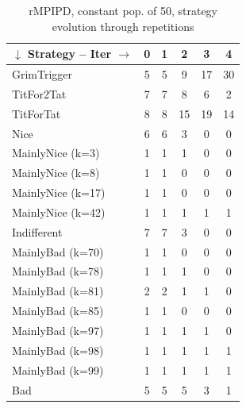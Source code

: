 \documentclass[journal,10pt,twoside]{IEEEtran}
\begin{document}
\begin{table}[ht]
	\caption{rMPIPD, constant pop. of 50, strategy evolution through repetitions}
	\label{tab:ripdmp-const}
	\centering
    \begin{tabular}{l|ccccc} \toprule
    	$\downarrow$ Strategy -- Iter $\rightarrow$  & 0 & 1 & 2 & 3 & 4 \\ \midrule
    	GrimTrigger       &  5 &  5 &   9 &  17 &  30 \\
    	TitFor2Tat        &  7 &  7 &   8 &   6 &   2 \\
    	TitForTat         &  8 &  8 &  15 &  19 &  14 \\
    	Nice              &  6 &  6 &   3 &   0 &   0 \\
    	MainlyNice (k=3)  &  1 &  1 &   1 &   0 &   0 \\
    	MainlyNice (k=8)  &  1 &  1 &   0 &   0 &   0 \\
    	MainlyNice (k=17) &  1 &  1 &   0 &   0 &   0 \\
    	MainlyNice (k=42) &  1 &  1 &   1 &   1 &   1 \\
    	Indifferent       &  7 &  7 &   3 &   0 &   0 \\
    	MainlyBad (k=70)  &  1 &  1 &   0 &   0 &   0 \\
    	MainlyBad (k=78)  &  1 &  1 &   1 &   0 &   0 \\
    	MainlyBad (k=81)  &  2 &  2 &   1 &   1 &   0 \\
    	MainlyBad (k=85)  &  1 &  1 &   0 &   0 &   0 \\
    	MainlyBad (k=97)  &  1 &  1 &   1 &   1 &   0 \\
    	MainlyBad (k=98)  &  1 &  1 &   1 &   1 &   1 \\
    	MainlyBad (k=99)  &  1 &  1 &   1 &   1 &   1 \\
    	Bad               &  5 &  5 &   5 &   3 &   1 \\ \bottomrule
    \end{tabular}
\end{table}
\end{document}
